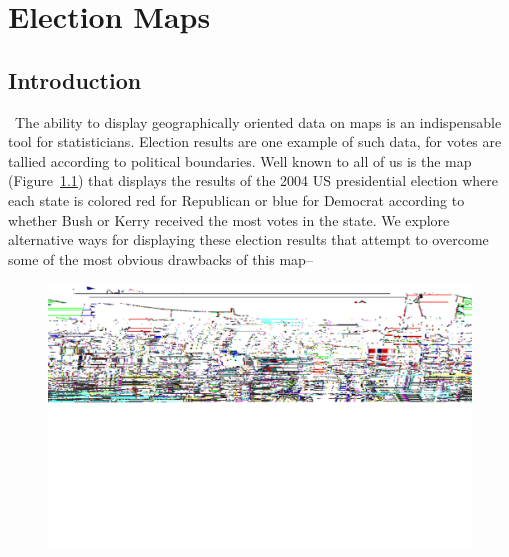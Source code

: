 \chapter{Election Maps}

\section{Introduction}\
The ability to display geographically oriented data on maps is an 
indispensable tool for statisticians.
Election results are one example of such data, for votes are tallied according 
to political boundaries.
Well known to all of us is the map (Figure~\ref{fig:statemapredbluelarge})
that displays the results of the 2004 US presidential election
where each state is colored red for Republican or blue for Democrat according 
to whether Bush or Kerry received the most votes in the state. 
We explore alternative ways for displaying these 
election results that attempt to overcome some of the most
obvious drawbacks of this map--

\begin{figure}
\includegraphics{electionMaps/statemapredbluelarge.pdf}
\caption{ }
\label{fig:statemapredbluelarge}
\end{figure} 

